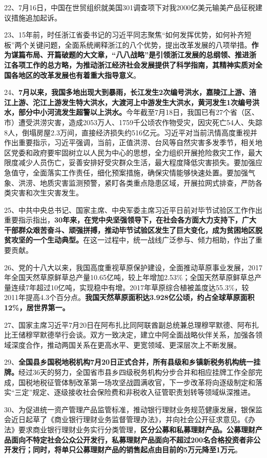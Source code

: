 22、7月16日，中国在世贸组织就美国301调查项下对我2000亿美元输美产品征税建议措施追加起诉。

23、15年前，时任浙江省委书记的习近平同志聚焦``如何发挥优势，如何补齐短板''两个关键问题，全面系统阐释浙江的八个优势，提出改革发展的八项举措。{\textbf{作为谋篇布局、开篇破题的大文章，``八八战略''是引领浙江发展的总纲领、推进浙江各项工作的总方略，为推动浙江经济社会发展提供了科学指南，其精神实质对全国各地区的改革发展也有着重大指导意义}}。

24、{\textbf{7月以来，我国多地出现大到暴雨，长江发生2次编号洪水，嘉陵江上游、涪江上游、沱江上游发生特大洪水，大渡河上中游发生大洪水，黄河发生1次编号洪水，部分中小河流发生超警以上洪水。}}今年截至7月18日，我国已有27个省（区、市）遭受洪涝灾害，造成2053万人、1759千公顷农作物受灾，因灾死亡54人、失踪8人，倒塌房屋2.3万间，直接经济损失约516亿元。习近平对当前汛情高度重视并作出重要指示，习近平强调，当前，正值洪涝、台风等自然灾害多发季节，相关地区党委和政府要牢固树立以人民为中心的思想，全力组织开展抢险救灾工作，最大限度减少人员伤亡，妥善安排好受灾群众生活，最大程度降低灾害损失。要加强应急值守，全面落实工作责任，细化预案措施，确保灾情能够快速处置。要加强气象、洪涝、地质灾害监测预警，紧盯各类重点隐患区域，开展拉网式排查，严防各类灾害和次生灾害发生。

25、中共中央总书记、国家主席、中央军委主席习近平日前对毕节试验区工作作出重要指示指出，{\textbf{30年来，在党中央坚强领导下，在社会各方面大力支持下，广大干部群众艰苦奋斗、顽强拼搏，推动毕节试验区发生了巨大变化，成为贫困地区脱贫攻坚的一个生动典型。}}在这一过程中，统一战线广泛参与、倾力相助，作出了重要贡献。

26、党的十八大以来，我国高度重视草原保护建设，全面推动草原事业发展，2017年全国天然草原鲜草总产量10.65亿吨，较上年增加2.53\%；全国天然草原鲜草总产量连续7年超过10亿吨，实现稳中有增。2017年草原综合植被盖度达55.3\%，较2011年提高4.3个百分点。{\textbf{我国天然草原面积达3.928亿公顷，约占全球草原面积12\%，居世界第一。}}

27、国家主席习近平7月20日在阿布扎比同阿联酋副总统兼总理穆罕默德、阿布扎比王储穆罕默德举行会谈。双方一致决定，建立中阿全面战略伙伴关系，加强各领域深度合作，推动两国关系在更高水平、更宽领域、更深层次上不断发展。

29、\textbf{{全国县乡国税地税机构7月20日正式合并，所有县级和乡镇新税务机构统一挂牌。}}经过36天的努力，全国省市县乡四级税务机构分步合并和相应挂牌工作全部完成，国税地税征管体制改革第一场攻坚战圆满收官，下一步改革将向逐级制定和落实``三定''规定、逐级接收社会保险费和非税收入征管职责划转等领域纵深推进。

30、为促进统一资产管理产品监管标准，推动银行理财业务规范健康发展，银保监会近日起草了《商业银行理财业务监督管理办法》，并向社会公开征求意见。《办法》要求商业银行理财业务实行分类管理，{\textbf{区分公募和私募理财产品。公募理财产品面向不特定社会公众公开发行，私募理财产品面向不超过200名合格投资者非公开发行；同时，将单只公募理财产品的销售起点由目前的5万元降至1万元}}。

